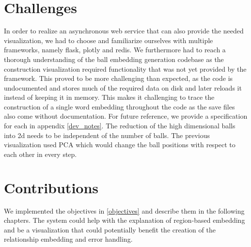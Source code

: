\section{Challenges}
In order to realize an asynchronous web service that can also provide the needed visualization, we had to choose and familiarize ourselves with multiple frameworks, namely flask, plotly and redis.
We furthermore had to reach a thorough understanding of the ball embedding generation codebase as the construction visualization required functionality that was not yet provided by the framework.
This proved to be more challenging than expected, as the code is undocumented and stores much of the required data on disk and later reloads it instead of keeping it in memory. This makes it challenging to trace the construction of a single word embedding throughout the code as the save files also come without documentation. For future reference, we provide a specification for each in appendix \ref{dev_notes}.
The reduction of the high dimensional balls into 2d needs to be independent of the number of balls. The previous visualization used PCA which would change the ball positions with respect to each other in every step.

\section{Contributions}
We implemented the objectives in \ref{objectives} and describe them in the following chapters. The system could help with the explanation of region-based embedding and be a visualization that could potentially benefit the creation of the relationship embedding and error handling.

